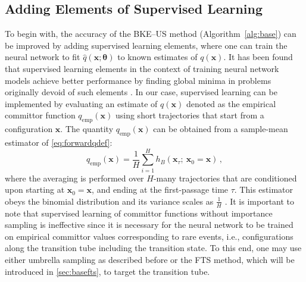 \documentclass{article}
\numberwithin{equation}{section}
\def\*#1{\mathbf{#1}}
\theoremstyle{definition}
\theoremstyle{remark}
\def\thetab{\boldsymbol{\theta}}
\begin{document}
\subsection{Adding Elements of Supervised Learning} \label{sec:basesl}

To begin with, the accuracy of the BKE--US method (Algorithm~\ref{alg:base}) can be improved by adding supervised learning elements, where one can train the neural network to fit $\hat{q}(\* x; \thetab)$ to known estimates of $ q ( \* x ) $.
It has been found that supervised learning elements in the context of training neural network models achieve better performance by finding global minima in problems originally devoid of such elements \citep{du2018gradient, du2019gradient,hardtrecht}.
In our case, supervised learning can be implemented by evaluating an estimate of $ q ( \* x) $ denoted as the empirical committor function $ q_\mathrm{emp}(\* x) $ using short trajectories that start from a configuration $\* x$. The quantity $ q_\mathrm{emp}(\* x) $ can be obtained from a sample-mean estimator of  \cref{eq:forwardqdef}:
\begin{equation}
    q_\mathrm{emp}(\* x) = \frac{1}{H} \sum_{i=1}^{H} h_{B} \left(\* x_{\tau} ; \ \* x_0 = \* x \right) \,, \label{eq:empiricalcommittor}
\end{equation}
where the averaging is performed over $H$-many trajectories that are conditioned upon starting at $\* x_0 = \* x$, and ending at the first-passage time $\tau$.
This estimator obeys the binomial distribution and its variance scales as $ \frac{1}{H} $ \cite{peters2006}. 
It is important to note that supervised learning of committor functions without importance sampling is ineffective since it is necessary for the neural network to be trained on empirical committor values corresponding to rare events, i.e., configurations along the transition tube including the transition state. To this end, one may use either umbrella sampling as described before or the FTS method, which will be introduced in \cref{sec:basefts}, to target the transition tube.
\end{document}
